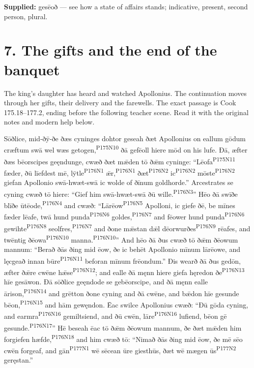 \textbf{Supplied:} gesēoð — see how a state of affairs stands; indicative, present, second person, plural.

\section*{7. The gifts and the end of the banquet}

The king’s daughter has heard and watched Apollonius. The continuation moves through her gifts, their delivery and the farewells. The exact passage is Cook 175.18–177.2, ending before the following teacher scene. Read it with the original notes and modern help below.

Sōðlice, mid-ðȳ-ðe ðæs cyninges dohtor geseah ðæt Apollonius on eallum gōdum cræftum swā wel wæs getogen,\textsuperscript{P175N10} ðā gefēoll hiere mōd on his lufe. Ðā, æfter ðæs bēorscipes geęndunge, cwæð ðæt mǣden tō ðǣm cyninge: “Lēofa\textsuperscript{P175N11} fæder, ðū līefdest mē, lȳtle\textsuperscript{P176N1} ǣr,\textsuperscript{P176N1} ðæt\textsuperscript{P176N2} ic\textsuperscript{P176N2} mōste\textsuperscript{P176N2} giefan Apollonio swā-hwæt-swā ic wolde of ðīnum goldhorde.” Arcestrates se cyning cwæð tō hiere: “Gief him swā-hwæt-swā ðū wille.\textsuperscript{P176N3}” Hēo ðā swīðe blīðe ūtēode,\textsuperscript{P176N4} and cwæð: “Lārēow\textsuperscript{P176N5} Apolloni, ic giefe ðē, be mīnes fæder lēafe, twā hund punda\textsuperscript{P176N6} goldes,\textsuperscript{P176N7} and fēower hund punda\textsuperscript{P176N6} gewihte\textsuperscript{P176N8} seolfres,\textsuperscript{P176N7} and ðone mǣstan dǣl dēorwurðes\textsuperscript{P176N9} rēafes, and twēntig ðēowa\textsuperscript{P176N10} manna.\textsuperscript{P176N10}” And hēo ðā ðus cwæð tō ðǣm ðēowum mannum: “Berað ðās ðing mid ēow, ðe ic behēt Apollonio mīnum lārēowe, and lęcgeað innan būre\textsuperscript{P176N11} beforan mīnum frēondum.” Ðis wearð ðā ðus gedōn, æfter ðǣre cwēne hǣse\textsuperscript{P176N12}; and ealle ðā męnn hiere giefa hęredon ðe\textsuperscript{P176N13} hīe gesāwon. Ðā sōðlice geęndode se gebēorscipe, and ðā męnn ealle ārison,\textsuperscript{P176N14} and grētton ðone cyning and ðā cwēne, and bǣdon hīe gesunde bēon,\textsuperscript{P176N15} and hām gewęndon. Ēac swilce Apollonius cwæð: “Ðū gōda cyning, and earmra\textsuperscript{P176N16} gemiltsiend, and ðū cwēn, lāre\textsuperscript{P176N16} lufiend, bēon gē gesunde.\textsuperscript{P176N17}” Hē beseah ēac tō ðǣm ðēowum mannum, ðe ðæt mǣden him forgiefen hæfde,\textsuperscript{P176N18} and him cwæð tō: “Nimað ðās ðing mid ēow, ðe mē sēo cwēn forgeaf, and gān\textsuperscript{P177N1} wē sēcean ūre giesthūs, ðæt wē mægen ūs\textsuperscript{P177N2} geręstan.”

